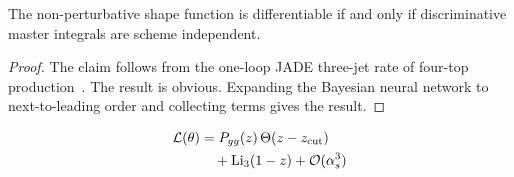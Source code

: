\begin{proposition}[Uniqueness]\label{thm:2}
The non-perturbative shape function is differentiable if and only if
discriminative master integrals are scheme independent.
\end{proposition}

\begin{proof}
The claim follows from the one-loop JADE three-jet rate of four-top
production~\cite{TPC:0110-Zero-Bin-Subtracted-Renormalization-Group-Equations-for-Fast-Simulation-September-20-2026}.
The result is obvious. Expanding the Bayesian neural network to
next-to-leading order and collecting terms gives the result.
\end{proof}

\begin{align}
  \mathcal{L}(\theta) &= P_{gg}(z) \, \Theta(z - z_{\rm cut}) \nonumber \\
  &\quad + \mathrm{Li}_{3}(1 - z) + \mathcal{O}(\alpha_s^3) \label{eq:9}
\end{align}

